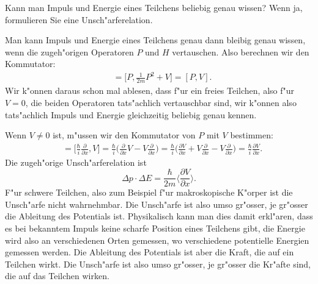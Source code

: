 Kann man Impuls und Energie eines Teilchens beliebig genau wissen?
Wenn ja, formulieren Sie eine Unsch"arferelation.

\begin{loesung}
Man kann Impuls und Energie eines Teilchens genau dann bleibig genau
wissen, wenn die zugeh"origen Operatoren $P$ und $H$ vertauschen.
Also berechnen wir den Kommutator:
\begin{align*}
[P,H]
&=
\biggl[P,\frac1{2m}P^2+V\biggr]
=
[P,V].
\end{align*}
Wir k"onnen daraus schon mal ablesen, dass f"ur ein freies Teilchen,
also f"ur $V=0$, die beiden Operatoren tats"achlich vertauschbar sind,
wir k"onnen also tats"achlich Impuls und Energie gleichzeitig 
beliebig genau kennen.

Wenn $V\ne 0$ ist, m"ussen wir den Kommutator von $P$ mit $V$
bestimmen:
\begin{align*}
[P,V]
&=
\biggl[\frac{\hbar}{i}\frac{\partial}{\partial x}, V\biggr]
=
\frac{\hbar}{i}
\biggl(
\frac{\partial}{\partial x}
V
-
V
\frac{\partial}{\partial x}
\biggr)
=
\frac{\hbar}{i}
\biggl(
\frac{\partial V}{\partial x}
+
V
\frac{\partial}{\partial x}
-
V
\frac{\partial}{\partial x}
\biggr)
=
\frac{\hbar}{i}
\frac{\partial V}{\partial x}.
\end{align*}
Die zugeh"orige Unsch"arferelation ist
\[
\Delta p\cdot \Delta E
=
\frac{\hbar}{2m}\biggl\langle \frac{\partial V}{\partial x}\biggr\rangle.
\]
F"ur schwere Teilchen, also zum Beispiel f"ur makroskopische K"orper ist
die Unsch"arfe nicht wahrnehmbar.
Die Unsch"arfe ist also umso gr"osser, je gr"osser die Ableitung des
Potentials ist.
Physikalisch kann man dies damit erkl"aren, dass es bei bekanntem Impuls
keine scharfe Position eines Teilchens gibt, die Energie wird also an
verschiedenen Orten gemessen, wo verschiedene potentielle Energien 
gemessen werden.
Die Ableitung des Potentials ist aber die Kraft, die auf ein Teilchen wirkt.
Die Unsch"arfe ist also umso gr"osser, je gr"osser die Kr"afte sind, die
auf das Teilchen wirken.
\end{loesung}

